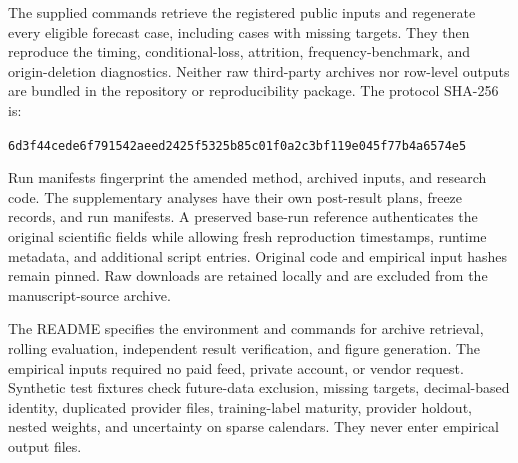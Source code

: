 \documentclass[10pt]{article}
\begin{document}
The supplied commands retrieve the registered public inputs and regenerate every eligible forecast case, including cases with missing targets. They then reproduce the timing, conditional-loss, attrition, frequency-benchmark, and origin-deletion diagnostics. Neither raw third-party archives nor row-level outputs are bundled in the repository or reproducibility package. The protocol SHA-256 is:

\begin{center}\scriptsize\texttt{6d3f44cede6f791542aeed2425f5325b85c01f0a2c3bf119e045f77b4a6574e5}\end{center}

Run manifests fingerprint the amended method, archived inputs, and research code. The supplementary analyses have their own post-result plans, freeze records, and run manifests. A preserved base-run reference authenticates the original scientific fields while allowing fresh reproduction timestamps, runtime metadata, and additional script entries. Original code and empirical input hashes remain pinned. Raw downloads are retained locally and are excluded from the manuscript-source archive.

The README specifies the environment and commands for archive retrieval, rolling evaluation, independent result verification, and figure generation. The empirical inputs required no paid feed, private account, or vendor request. Synthetic test fixtures check future-data exclusion, missing targets, decimal-based identity, duplicated provider files, training-label maturity, provider holdout, nested weights, and uncertainty on sparse calendars. They never enter empirical output files.
\end{document}
